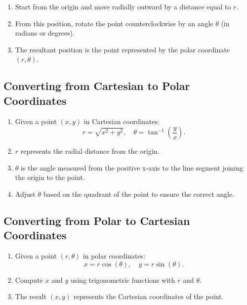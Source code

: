 \documentclass{article}
\begin{document}
\begin{tipbox}
    \begin{enumerate}
        \item Start from the origin and move radially outward by a distance equal to \( r \).
        \item From this position, rotate the point counterclockwise by an angle \( \theta \) (in radians or degrees).
        \item The resultant position is the point represented by the polar coordinate \( (r, \theta) \).
    \end{enumerate}
    
    \vspace{1em}
    
    \subsection*{Converting from Cartesian to Polar Coordinates}
    \begin{algorithmbox}
    
        \begin{enumerate}
            \item Given a point \( (x, y) \) in Cartesian coordinates:
                  \[
                  r = \sqrt{x^2 + y^2}, \quad \theta = \tan^{-1}\left(\frac{y}{x}\right).
                  \]
            \item \( r \) represents the radial distance from the origin.
            \item \( \theta \) is the angle measured from the positive x-axis to the line segment joining the origin to the point.
            \item Adjust \( \theta \) based on the quadrant of the point to ensure the correct angle.
        \end{enumerate}
    \end{algorithmbox}
    
    \vspace{1em}
    
    \subsection*{Converting from Polar to Cartesian Coordinates}
    \begin{algorithmbox}
        \begin{enumerate}
            \item Given a point \( (r, \theta) \) in polar coordinates:
                  \[
                  x = r\cos(\theta), \quad y = r\sin(\theta).
                  \]
            \item Compute \( x \) and \( y \) using trigonometric functions with \( r \) and \( \theta \).
            \item The result \( (x, y) \) represents the Cartesian coordinates of the point.
        \end{enumerate}
    \end{algorithmbox}
\end{tipbox}
\end{document}
